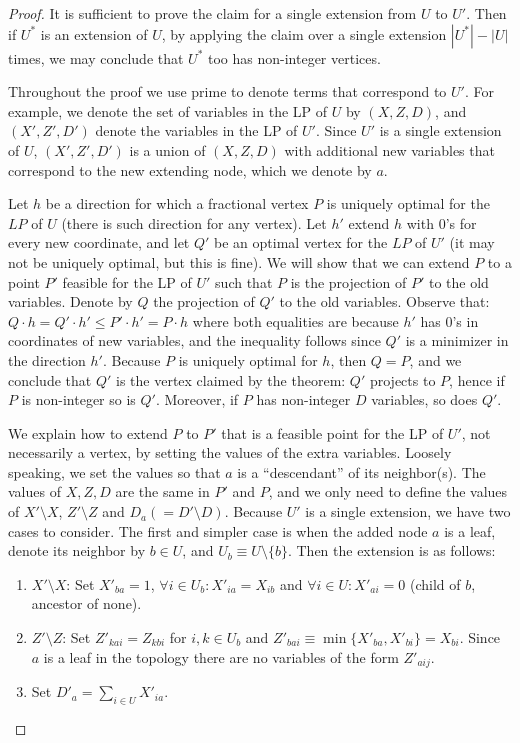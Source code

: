 \begin{proof}
It is sufficient to prove the claim for a single extension from $U$ to $U'$. Then if $U^*$ is an extension of $U$, by applying the claim over a single extension $|U^*|-|U|$ times, we may conclude that $U^*$ too has non-integer vertices.


Throughout the proof we  use prime to denote terms that correspond to $U'$. For example, we denote the set of variables in the LP of $U$ by $(X,Z,D)$, and  $(X',Z',D')$ denote the variables in the LP of $U'$. Since $U'$ is a single extension of $U$, $(X',Z',D')$ is a union of $(X,Z,D)$ with additional new variables that correspond to the new extending node, which we denote by $a$. 

Let $h$ be a direction for which a fractional vertex $P$ is uniquely optimal for the $LP$ of $U$ (there is such direction for any vertex). Let $h'$ extend $h$ with $0$'s for every new coordinate, and let $Q'$ be an optimal vertex for the $LP$ of $U'$ (it may not be uniquely optimal, but this is fine). We will show that we can extend $P$ to a point $P'$ feasible for the LP of $U'$ such that $P$ is the projection of $P'$ to the old variables. Denote by $Q$ the projection of $Q'$ to the old variables. Observe that: $Q \cdot h = Q' \cdot h' \le P' \cdot h' = P \cdot h$ where both equalities are because $h'$ has $0$'s in coordinates of new variables, and the inequality follows since $Q'$ is a minimizer in the direction $h'$. Because $P$ is uniquely optimal for $h$, then $Q = P$, and we conclude that $Q'$ is the vertex claimed by the theorem: $Q'$ projects to $P$, hence if $P$ is non-integer so is $Q'$. Moreover, if $P$ has non-integer $D$ variables, so does $Q'$.

We explain how to extend $P$ to $P'$ that is a feasible point for the LP of $U'$, not necessarily a vertex, by setting the values of the extra variables. Loosely speaking, we set the values so that $a$ is a ``descendant'' of its neighbor(s). The values of $X,Z,D$ are the same in $P'$ and $P$, and we only need to define the values of $X'\setminus X$, $Z' \setminus Z$ and $D_a (= D'\setminus D)$. Because $U'$ is a single extension, we have two cases to consider. The first and simpler case is when the added node $a$ is a leaf, denote its neighbor by $b \in U$, and $U_b \equiv U \setminus \{b\}$. Then the extension is as follows:
\begin{enumerate}
    \item $X' \setminus X$: Set $X'_{ba}=1$, $\forall i \in U_b: X'_{ia} = X_{ib}$ and $\forall i \in U: X'_{ai} = 0$ (child of $b$, ancestor of none).
    \item $Z' \setminus Z$: Set $Z'_{kai} = Z_{kbi}$ for $i,k \in U_b$ and $Z'_{bai} \equiv \min\{ X'_{ba}, X'_{bi} \} = X_{bi}$. Since $a$ is a leaf in the topology there are no variables of the form $Z'_{aij}$.
    \item Set $D'_a = \sum_{i \in U}{X'_{ia}}$.
\end{enumerate}


\end{proof}
